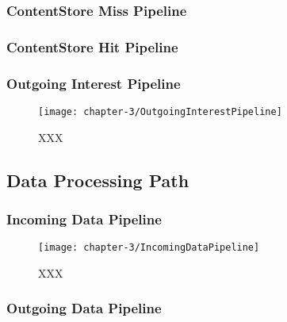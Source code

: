 \subsubsection{ContentStore Miss Pipeline}

\subsubsection{ContentStore Hit Pipeline}

\subsubsection{Outgoing Interest Pipeline}

\begin{figure}[H]
  \centering
  \texttt{[image: chapter-3/OutgoingInterestPipeline]}
  \caption{XXX}
  \label{fig:OutgoingInterestPipeline}
\end{figure}



\subsection{Data Processing Path}

\subsubsection{Incoming Data Pipeline}

\begin{figure}[H]
  \centering
  \texttt{[image: chapter-3/IncomingDataPipeline]}
  \caption{XXX}
  \label{fig:IncomingDataPipeline}
\end{figure}

\subsubsection{Outgoing Data Pipeline}
